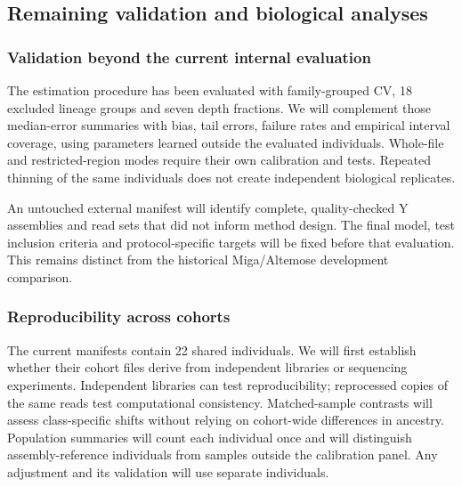 \subsection{Remaining validation and biological analyses}\label{sec:m-planned}

\subsubsection{Validation beyond the current internal evaluation}
The estimation procedure has been evaluated with family-grouped CV, 18 excluded lineage groups and seven depth fractions. We will complement those median-error summaries with bias, tail errors, failure rates and empirical interval coverage, using parameters learned outside the evaluated individuals. Whole-file and restricted-region modes require their own calibration and tests. Repeated thinning of the same individuals does not create independent biological replicates.

An untouched external manifest will identify complete, quality-checked Y assemblies and read sets that did not inform method design. The final model, test inclusion criteria and protocol-specific targets will be fixed before that evaluation. This remains distinct from the historical Miga/Altemose development comparison.

\subsubsection{Reproducibility across cohorts}
The current manifests contain 22 shared individuals. We will first establish whether their cohort files derive from independent libraries or sequencing experiments. Independent libraries can test reproducibility; reprocessed copies of the same reads test computational consistency. Matched-sample contrasts will assess class-specific shifts without relying on cohort-wide differences in ancestry. Population summaries will count each individual once and will distinguish assembly-reference individuals from samples outside the calibration panel. Any adjustment and its validation will use separate individuals.

